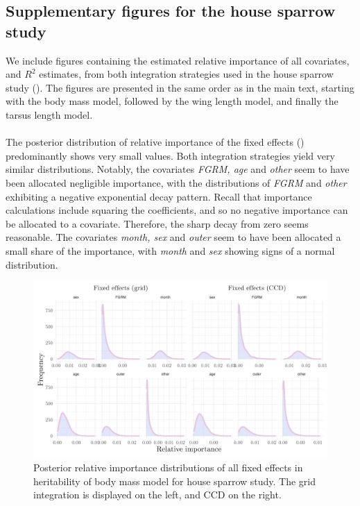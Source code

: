 \subsection*{Supplementary figures for the house sparrow study}

We include figures containing the estimated relative importance of all covariates, and $R^2$ estimates, from both integration strategies used in the house sparrow study (). The figures are presented in the same order as in the main text, starting with the body mass model, followed by the wing length model, and finally the tarsus length model.
\\
\\
The posterior distribution of relative importance of the fixed effects () predominantly shows very small values. Both integration strategies yield very similar distributions. Notably, the covariates \textit{FGRM, age} and \textit{other} seem to have been allocated negligible importance, with the distributions of \textit{FGRM} and \textit{other} exhibiting a negative exponential decay pattern. Recall that importance calculations include squaring the coefficients, and so no negative importance can be allocated to a covariate. Therefore, the sharp decay from zero seems reasonable. The covariates \textit{month, sex} and \textit{outer} seem to have been allocated a small share of the importance, with \textit{month} and \textit{sex} showing signs of a normal distribution.
\begin{figure}[H]%
  \centering
  \includegraphics[width=1\linewidth]{Figures/House sparrow study/Mass_fixed.png}
  \caption[Posterior relative importance distributions of all fixed effects in body mass model for house sparrow study]{Posterior relative importance distributions of all fixed effects in heritability of body mass model for house sparrow study. The grid integration is displayed on the left, and CCD on the right.}
  \label{fig:mass_fixed_sparrows}
\end{figure}

